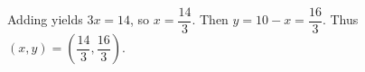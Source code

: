 Adding yields $3x=14$, so $x=\dfrac{14}{3}$. Then $y=10-x=\dfrac{16}{3}$. Thus $\boxed{(x,y)=\left(\dfrac{14}{3},\dfrac{16}{3}\right)}$.
